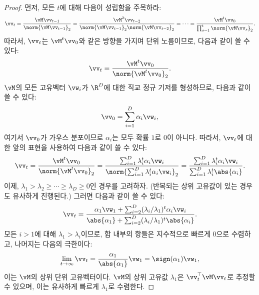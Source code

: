 \documentclass[../../book-main_ko.tex]{subfiles}
\begin{document}
\begin{proof} 먼저, 모든 \(t\)에 대해 다음이 성립함을 주목하라:
\begin{equation}
    \vv_{t} = \frac{\vM\vv_{t - 1}}{\norm{\vM\vv_{t - 1}}_{2}} = \frac{\vM^{2}\vv_{t - 2}}{\norm{\vM\vv_{t - 1}}_{2}\norm{\vM\vv_{t - 2}}_{2}} = \cdots = \frac{\vM^{t}\vv_{0}}{\prod_{s = 1}^{t}\norm{\vM\vv_{s}}_{2}}.
\end{equation}
따라서, \(\vv_{t}\)는 \(\vM^{t}\vv_{0}\)와 같은 방향을 가지며 단위 노름이므로, 다음과 같이 쓸 수 있다:
\begin{equation}
    \vv_{t} = \frac{\vM^{t}\vv_{0}}{\norm{\vM^{t}\vv_{0}}_{2}}.
\end{equation}
$\vM$의 모든 고유벡터 \(\vw_{i}\)가 \(\R^{D}\)에 대한 직교 정규 기저를 형성하므로, 다음과 같이 쓸 수 있다:
\begin{equation}
    \vv_{0} = \sum_{i = 1}^{D}\alpha_{i}\vw_{i},
\end{equation}
여기서 \(\vv_{0}\)가 가우스 분포이므로 \(\alpha_{i}\)는 모두 확률 \(1\)로 0이 아니다. 따라서, \(\vv_{t}\)에 대한 앞의 표현을 사용하여 다음과 같이 쓸 수 있다:
\begin{equation}
    \vv_{t} = \frac{\vM^{t}\vv_{0}}{\norm{\vM^{t}\vv_{0}}_{2}} = \frac{\sum_{i = 1}^{D}\lambda_{i}^{t}\alpha_{i}\vw_{i}}{\norm{\sum_{i = 1}^{D}\lambda_{i}^{t}\alpha_{i}\vw_{i}}_{2}} = \frac{\sum_{i = 1}^{D}\lambda_{i}^{t}\alpha_{i}\vw_{i}}{\sum_{i = 1}^{D}\lambda_{i}^{t}\abs{\alpha_{i}}}.
\end{equation}
이제, \(\lambda_{1} > \lambda_{2} \geq \cdots \geq \lambda_{D} \geq 0\)인 경우를 고려하자. (반복되는 상위 고유값이 있는 경우도 유사하게 진행된다.) 그러면 다음과 같이 쓸 수 있다:
\begin{equation}
    \vv_{t} = \frac{\alpha_{1}\vw_{1} + \sum_{i = 2}^{D}(\lambda_{i}/\lambda_{1})^{t}\alpha_{i}\vw_{i}}{\abs{\alpha_{1}} + \sum_{i = 2}^{D}(\lambda_{i}/\lambda_{1})^{t}\abs{\alpha_{i}}}.
\end{equation}
모든 \(i > 1\)에 대해 \(\lambda_{1} > \lambda_{i}\)이므로, 합 내부의 항들은 지수적으로 빠르게 \(0\)으로 수렴하고, 나머지는 다음의 극한이다:
\begin{equation}
    \lim_{t \to \infty}\vv_{t} = \frac{\alpha_{1}}{\abs{\alpha_{1}}}\vw_{1} = \sign(\alpha_{1})\vw_{1},
\end{equation}
이는 \(\vM\)의 상위 단위 고유벡터이다. \(\vM\)의 상위 고유값 \(\lambda_{1}\)은 \(\vv_{t}^{\top}\vM\vv_{t}\)로 추정할 수 있으며, 이는 유사하게 빠르게 \(\lambda_{1}\)로 수렴한다.
\end{proof}
\end{document}
